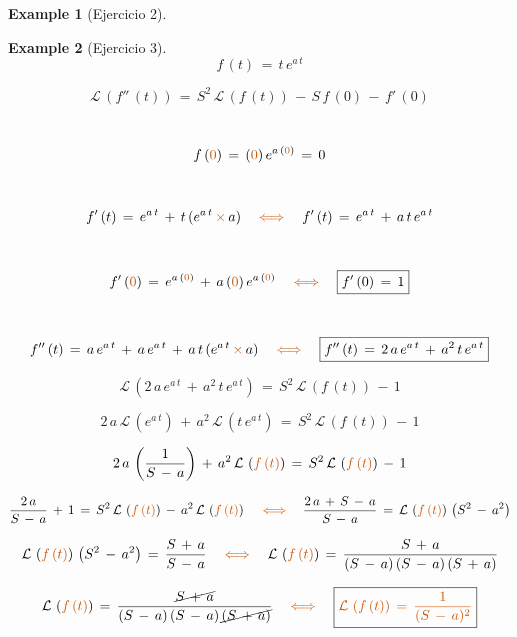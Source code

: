\documentclass[a4paper,11pt,openany]{book}
\newtheorem{exmp}{Example}[section]
\begin{document}
\begin{exmp}[Ejercicio 2]
 
\end{exmp}
 
\begin{exmp}[Ejercicio 3]
 
$$f\,(t)\,=\,t\,e^{a\,t}$$
 
 
$$\boxed{\mathcal{L}\,\left(f''\,(t) \right)\,=\,S^{2}\,\mathcal{L}\,\left(f\,(t) \right)\,-\,S\,f\,(0)\,-\,f'\,(0)}$$
 
\textcolor{burntorange}{}\, $$f\,(\textcolor{burntorange}{0})\,=\,(\textcolor{burntorange}{0})\,e^{a\,(\textcolor{burntorange}{0})}\,=\,0$$
 
\textcolor{burntorange}{}\, $$f'\,(t)\,=\,e^{a\,t}\,+\,t\,(e^{a\,t}\,\textcolor{burntorange}{\times}\,a) \quad \textcolor{burntorange}{\iff} \quad f'\,(t)\,=\,e^{a\,t}\,+\,a\,t\,e^{a\,t}$$
 
\textcolor{burntorange}{}\, $$f'\,(\textcolor{burntorange}{0})\,=\,e^{a\,(\textcolor{burntorange}{0})}\,+\,a\,(\textcolor{burntorange}{0})\,e^{a\,(\textcolor{burntorange}{0})} \quad \textcolor{burntorange}{\iff} \quad \boxed{f'\,(0)\,=\,1}$$
 
\textcolor{burntorange}{}\, $$f''\,(t)\,=\,a\,e^{a\,t}\,+\,a\,e^{a\,t}\,+\,a\,t\,(e^{a\,t}\,\textcolor{burntorange}{\times}\,a) \quad \textcolor{burntorange}{\iff} \quad \boxed{f''\,(t)\,=\,2\,a\,e^{a\,t}\,+\,a^{2}\,t\,e^{a\,t}}$$
 
$$\mathcal{L}\,\left(2\,a\,e^{a\,t}\,+\,a^{2}\,t\,e^{a\,t} \right)\,=\,S^{2}\,\mathcal{L}\,\left(f\,(t) \right)\,-\,1$$
 
$$2\,a\,\mathcal{L}\,\left(e^{a\,t} \right)\,+\,a^{2}\,\mathcal{L}\,\left(t\,e^{a\,t} \right)\,=\,S^{2}\,\mathcal{L}\,\left(f\,(t) \right)\,-\,1$$
 
$$2\,a\,\left(\dfrac{1}{S\,-\,a} \right)\,+\,a^{2}\,\mathcal{L}\,\left(\textcolor{burntorange}{f\,(t) } \right)\,=\,S^{2}\,\mathcal{L}\,\left(\textcolor{burntorange}{f\,(t) } \right)\,-\,1 $$
 
$$\dfrac{2\,a}{S\,-\,a}\,+\,1\,=\,S^{2}\,\mathcal{L}\,\left(\textcolor{burntorange}{f\,(t) } \right)\,-\,a^{2}\,\mathcal{L}\,\left(\textcolor{burntorange}{f\,(t) } \right) \quad \textcolor{burntorange}{\iff} \quad \dfrac{2\,a\,+\,S\,-\,a}{S\,-\,a}\,=\,\mathcal{L}\,\left(\textcolor{burntorange}{f\,(t) } \right)\,\left(S^{2}\,-\,a^{2} \right)$$
 
$$\mathcal{L}\,\left(\textcolor{burntorange}{f\,(t) } \right)\,\left(S^{2}\,-\,a^{2} \right)\,=\,\dfrac{S\,+\,a}{S\,-\,a} \quad \textcolor{burntorange}{\iff} \quad \mathcal{L}\,\left(\textcolor{burntorange}{f\,(t) } \right)\,=\,\dfrac{S\,+\,a}{(S\,-\,a)\,(S\,-\,a)\,(S\,+\,a) }$$
 
$$\mathcal{L}\,\left(\textcolor{burntorange}{f\,(t) } \right)\,=\,\dfrac{\cancel{S\,+\,a}}{(S\,-\,a)\,(S\,-\,a)\,\cancel{(S\,+\,a)} } \quad \textcolor{burntorange}{\iff} \quad \boxed{\textcolor{burntorange}{\mathcal{L}\,\left(\textcolor{burntorange}{f\,(t) } \right)\,=\,\dfrac{1}{(S\,-\,a)^{2}} } }$$
 
\end{exmp}
 
\end{document}

